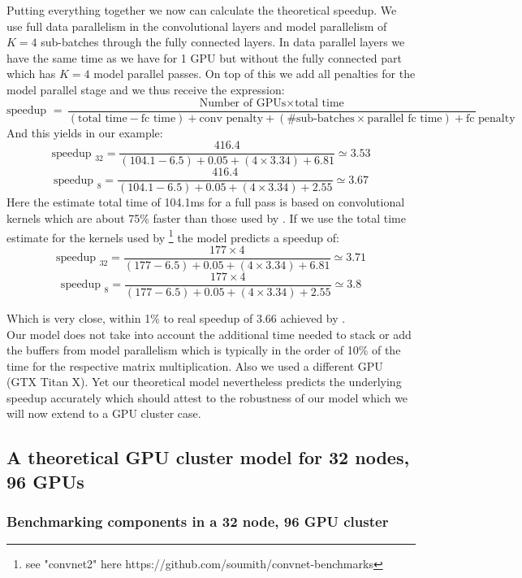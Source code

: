 \documentclass{article} %
\begin{document}
Putting everything together we now can calculate the theoretical speedup. We use full data parallelism in the convolutional layers and model parallelism of $K=4$ sub-batches through the fully connected layers. In data parallel layers we have the same time as we have for 1 GPU but without the fully connected part which has $K=4$ model parallel passes. On top of this we add all penalties for the model parallel stage and we thus receive the expression:
\[ \mbox{speedup } = \frac{\mbox{Number of GPUs}\times \mbox{total time}}{(\mbox{total time} - \mbox{fc time}) + \mbox{conv penalty} + (\mbox{\#sub-batches}\times\mbox{parallel fc time}) + \mbox{fc penalty} } \]
And this yields in our example:
\[ \mbox{speedup }_{32} = \frac{416.4}{(104.1 - 6.5) + 0.05 + (4\times3.34) + 6.81} \simeq 3.53 \]
\[ \mbox{speedup }_{8} = \frac{416.4}{(104.1 - 6.5) + 0.05 + (4\times3.34) + 2.55} \simeq 3.67 \]
Here the estimate total time of 104.1ms for a full pass is based on convolutional kernels which are about 75\% faster than those used by \citet{krizhevsky2014one}. If we use the total time estimate for the kernels used by \citet{krizhevsky2014one}\footnote{see "convnet2" here https://github.com/soumith/convnet-benchmarks} the model predicts a speedup of:
\[ \mbox{speedup }_{32} = \frac{177\times 4}{(177 - 6.5) + 0.05 + (4\times3.34) + 6.81} \simeq 3.71 \]
\[ \mbox{speedup }_{8} = \frac{177\times 4}{(177 - 6.5) + 0.05 + (4\times3.34) + 2.55} \simeq 3.8 \]

Which is very close, within 1\% to real speedup of 3.66 achieved by \citet{krizhevsky2014one}. \\

Our model does not take into account the additional time needed to stack or add the buffers from model parallelism which is typically in the order of 10\% of the time for the respective matrix multiplication. Also we used a different GPU (GTX Titan X). Yet our theoretical model nevertheless predicts the underlying speedup accurately which should attest to the robustness of our model which we will now extend to a GPU cluster case.

\subsection{A theoretical GPU cluster model for 32 nodes, 96 GPUs}

\subsubsection{Benchmarking components in a 32 node, 96 GPU cluster}
\end{document}
